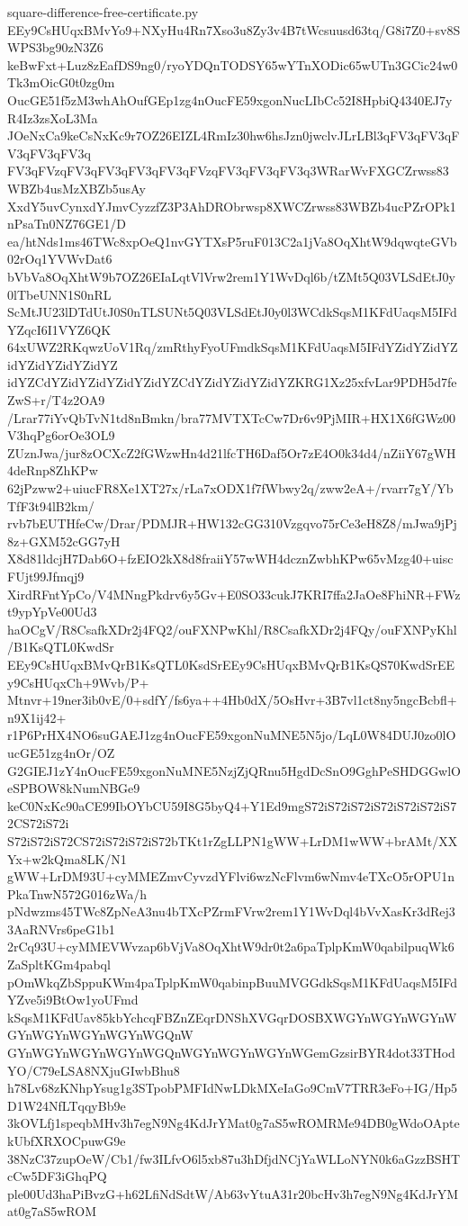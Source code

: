 \documentclass[11pt]{article}
\theoremstyle{definition}
\theoremstyle{remark}
\begin{document}
\begin{filecontents*}[overwrite]{square-difference-free-certificate.py}
EEy9CsHUqxBMvYo9+NXyHu4Rn7Xso3u8Zy3v4B7tWcsuusd63tq/G8i7Z0+sv8SWPS3bg90zN3Z6
keBwFxt+Luz8zEafDS9ng0/ryoYDQnTODSY65wYTnXODic65wUTn3GCic24w0Tk3mOicG0t0zg0m
OucGE51f5zM3whAhOufGEp1zg4nOucFE59xgonNucLIbCc52I8HpbiQ4340EJ7yR4Iz3zsXoL3Ma
JOeNxCa9keCsNxKc9r7OZ26EIZL4RmIz30hw6hsJzn0jwclvJLrLBl3qFV3qFV3qFV3qFV3qFV3q
FV3qFVzqFV3qFV3qFV3qFV3qFVzqFV3qFV3qFV3q3WRarWvFXGCZrwss83WBZb4usMzXBZb5usAy
XxdY5uvCynxdYJmvCyzzfZ3P3AhDRObrwsp8XWCZrwss83WBZb4ucPZrOPk1nPsaTn0NZ76GE1/D
ea/htNds1ms46TWc8xpOeQ1nvGYTXsP5ruF013C2a1jVa8OqXhtW9dqwqteGVb02rOq1YVWvDat6
bVbVa8OqXhtW9b7OZ26EIaLqtVlVrw2rem1Y1WvDql6b/tZMt5Q03VLSdEtJ0y0lTbeUNN1S0nRL
ScMtJU23lDTdUtJ0S0nTLSUNt5Q03VLSdEtJ0y0l3WCdkSqsM1KFdUaqsM5IFdYZqcI6I1VYZ6QK
64xUWZ2RKqwzUoV1Rq/zmRthyFyoUFmdkSqsM1KFdUaqsM5IFdYZidYZidYZidYZidYZidYZidYZ
idYZCdYZidYZidYZidYZidYZCdYZidYZidYZidYZKRG1Xz25xfvLar9PDH5d7feZwS+r/T4z2OA9
/Lrar77iYvQbTvN1td8nBmkn/bra77MVTXTcCw7Dr6v9PjMIR+HX1X6fGWz00V3hqPg6orOe3OL9
ZUznJwa/jur8zOCXcZ2fGWzwHn4d21lfcTH6Daf5Or7zE4O0k34d4/nZiiY67gWH4deRnp8ZhKPw
62jPzww2+uiucFR8Xe1XT27x/rLa7xODX1f7fWbwy2q/zww2eA+/rvarr7gY/YbTfF3t94lB2km/
rvb7bEUTHfeCw/Drar/PDMJR+HW132cGG310Vzgqvo75rCe3eH8Z8/mJwa9jPj8z+GXM52cGG7yH
X8d81ldcjH7Dab6O+fzEIO2kX8d8fraiiY57wWH4dcznZwbhKPw65vMzg40+uiscFUjt99Jfmqj9
XirdRFntYpCo/V4MNngPkdrv6y5Gv+E0SO33cukJ7KRI7ffa2JaOe8FhiNR+FWzt9ypYpVe00Ud3
haOCgV/R8CsafkXDr2j4FQ2/ouFXNPwKhl/R8CsafkXDr2j4FQy/ouFXNPyKhl/B1KsQTL0KwdSr
EEy9CsHUqxBMvQrB1KsQTL0KsdSrEEy9CsHUqxBMvQrB1KsQS70KwdSrEEy9CsHUqxCh+9Wvb/P+
Mtnvr+19ner3ib0vE/0+sdfY/fs6ya++4Hb0dX/5OsHvr+3B7vl1ct8ny5ngcBcbfl+n9X1ij42+
r1P6PrHX4NO6suGAEJ1zg4nOucFE59xgonNuMNE5N5jo/LqL0W84DUJ0zo0lOucGE51zg4nOr/OZ
G2GIEJ1zY4nOucFE59xgonNuMNE5NzjZjQRnu5HgdDcSnO9GghPeSHDGGwlOeSPBOW8kNumNBGe9
keC0NxKc90aCE99IbOYbCU59I8G5byQ4+Y1Ed9mgS72iS72iS72iS72iS72iS72iS72CS72iS72i
S72iS72iS72CS72iS72iS72iS72bTKt1rZgLLPN1gWW+LrDM1wWW+brAMt/XXYx+w2kQma8LK/N1
gWW+LrDM93U+cyMMEZmvCyvzdYFlvi6wzNcFlvm6wNmv4eTXcO5rOPU1nPkaTnwN572G016zWa/h
pNdwzms45TWc8ZpNeA3nu4bTXcPZrmFVrw2rem1Y1WvDql4bVvXasKr3dRej33AaRNVrs6peG1b1
2rCq93U+cyMMEVWvzap6bVjVa8OqXhtW9dr0t2a6paTplpKmW0qabilpuqWk6ZaSpltKGm4pabql
pOmWkqZbSppuKWm4paTplpKmW0qabinpBuuMVGGdkSqsM1KFdUaqsM5IFdYZve5i9BtOw1yoUFmd
kSqsM1KFdUav85kbYchcqFBZnZEqrDNShXVGqrDOSBXWGYnWGYnWGYnWGYnWGYnWGYnWGYnWGQnW
GYnWGYnWGYnWGYnWGQnWGYnWGYnWGYnWGemGzsirBYR4dot33THodYO/C79eLSA8NXjuGIwbBhu8
h78Lv68zKNhpYsug1g3STpobPMFIdNwLDkMXeIaGo9CmV7TRR3eFo+IG/Hp5D1W24NfLTqqyBb9e
3kOVLfj1speqbMHv3h7egN9Ng4KdJrYMat0g7aS5wROMRMe94DB0gWdoOAptekUbfXRXOCpuwG9e
38NzC37zupOeW/Cb1/fw3ILfvO6l5xb87u3hDfjdNCjYaWLLoNYN0k6aGzzBSHTcCw5DF3iGhqPQ
ple00Ud3haPiBvzG+h62LfiNdSdtW/Ab63vYtuA31r20bcHv3h7egN9Ng4KdJrYMat0g7aS5wROM

\end{filecontents*}
\end{document}

